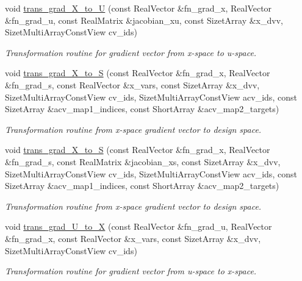 \begin{DoxyCompactItemize}
void \hyperlink{classPecos_1_1NatafTransformation_af54120bc359031c6fb812013af1488e1}{trans\+\_\+grad\+\_\+\+X\+\_\+to\+\_\+U} (const Real\+Vector \&fn\+\_\+grad\+\_\+x, Real\+Vector \&fn\+\_\+grad\+\_\+u, const Real\+Matrix \&jacobian\+\_\+xu, const Sizet\+Array \&x\+\_\+dvv, Sizet\+Multi\+Array\+Const\+View cv\+\_\+ids)
\begin{DoxyCompactList}\small\item\em Transformation routine for gradient vector from x-\/space to u-\/space. \end{DoxyCompactList}\item 
void \hyperlink{classPecos_1_1NatafTransformation_ade156a969120a98a9a7c7cab9a96b95a}{trans\+\_\+grad\+\_\+\+X\+\_\+to\+\_\+S} (const Real\+Vector \&fn\+\_\+grad\+\_\+x, Real\+Vector \&fn\+\_\+grad\+\_\+s, const Real\+Vector \&x\+\_\+vars, const Sizet\+Array \&x\+\_\+dvv, Sizet\+Multi\+Array\+Const\+View cv\+\_\+ids, Sizet\+Multi\+Array\+Const\+View acv\+\_\+ids, const Sizet\+Array \&acv\+\_\+map1\+\_\+indices, const Short\+Array \&acv\+\_\+map2\+\_\+targets)
\begin{DoxyCompactList}\small\item\em Transformation routine from x-\/space gradient vector to design space. \end{DoxyCompactList}\item 
void \hyperlink{classPecos_1_1NatafTransformation_a3c3f2d04567b733c649d76da95053349}{trans\+\_\+grad\+\_\+\+X\+\_\+to\+\_\+S} (const Real\+Vector \&fn\+\_\+grad\+\_\+x, Real\+Vector \&fn\+\_\+grad\+\_\+s, const Real\+Matrix \&jacobian\+\_\+xs, const Sizet\+Array \&x\+\_\+dvv, Sizet\+Multi\+Array\+Const\+View cv\+\_\+ids, Sizet\+Multi\+Array\+Const\+View acv\+\_\+ids, const Sizet\+Array \&acv\+\_\+map1\+\_\+indices, const Short\+Array \&acv\+\_\+map2\+\_\+targets)
\begin{DoxyCompactList}\small\item\em Transformation routine from x-\/space gradient vector to design space. \end{DoxyCompactList}\item 
void \hyperlink{classPecos_1_1NatafTransformation_a1c9148d72997a3013aebbb513a998a96}{trans\+\_\+grad\+\_\+\+U\+\_\+to\+\_\+X} (const Real\+Vector \&fn\+\_\+grad\+\_\+u, Real\+Vector \&fn\+\_\+grad\+\_\+x, const Real\+Vector \&x\+\_\+vars, const Sizet\+Array \&x\+\_\+dvv, Sizet\+Multi\+Array\+Const\+View cv\+\_\+ids)
\begin{DoxyCompactList}\small\item\em Transformation routine for gradient vector from u-\/space to x-\/space. \end{DoxyCompactList}\item 

\end{DoxyCompactItemize}

